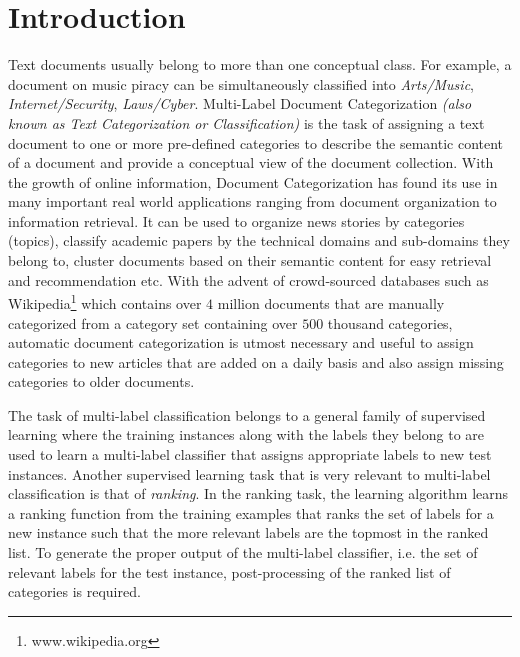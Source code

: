 \chapter{Introduction}
\label{chapter:introduction}


Text documents usually belong to more than one conceptual class. For example, a document on music piracy can be simultaneously classified into \emph{Arts/Music}, \emph{Internet/Security}, \emph{Laws/Cyber}.     Multi-Label Document Categorization \emph{(also known as Text Categorization or Classification)} is the task of assigning a text document to one or more pre-defined categories to describe the semantic content of a document and provide a conceptual view of the document collection.
With the growth of online information, Document Categorization has found its use in many important real world applications ranging from document organization to information retrieval. It can be used to organize news stories by categories (topics), classify academic papers by the technical domains and sub-domains they belong to, cluster documents based on their semantic content for easy retrieval and recommendation etc.
With the advent of crowd-sourced databases such as Wikipedia\footnote{www.wikipedia.org} which contains over $4$ million documents that are manually categorized from a category set containing over $500$ thousand categories, automatic document categorization is utmost necessary and useful to assign categories to new articles that are added on a daily basis and also assign missing categories to older documents.

The task of multi-label classification belongs to a general family of supervised learning where the training instances along with the labels they belong to are used to learn a multi-label classifier that assigns appropriate labels to new test instances. 
Another supervised learning task that is very relevant to multi-label classification is that of \emph{ranking}. In the ranking task, the learning algorithm learns a ranking function from the training examples that ranks the set of labels for a new instance such that the more relevant labels are the topmost in the ranked list. 
To generate the proper output of the multi-label classifier, i.e. the set of relevant labels for the test instance, post-processing of the ranked list of categories is required.

